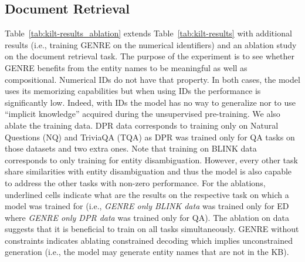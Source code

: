 \documentclass{article} \usepackage{main,times}
\makeatletter
\def\genre{\textsc{GENRE}\@\xspace}
\makeatother
\begin{document}
\subsection{Document Retrieval} \label{app:additional_retrival}
Table~\ref{tab:kilt-results_ablation} extends Table~\ref{tab:kilt-results} with additional results (i.e., training \genre on the numerical identifiers) and an ablation study on the document retrieval task. The purpose of the experiment is to see whether \genre benefits from the entity names to be meaningful as well as compositional. Numerical IDs do not have that property. In both cases, the model uses its memorizing capabilities but when using IDs the performance is significantly low. Indeed, with IDs the model has no way to generalize nor to use ``implicit knowledge'' acquired during the unsupervised pre-training. We also ablate the training data. DPR data corresponds to training only on Natural Questions (NQ) and TriviaQA (TQA) as DPR was trained only for QA tasks on those datasets and two extra ones. Note that training on BLINK data corresponds to only training for entity disambiguation. However, every other task share similarities with entity disambiguation and thus the model is also capable to address the other tasks with non-zero performance. For the ablations, underlined cells indicate what are the results on the respective task on which a model was trained for (i.e., \textit{\genre only BLINK data} was trained only for ED where\textit{ \genre only DPR data} was trained only for QA). The ablation on data suggests that it is beneficial to train on all tasks simultaneously. \genre without constraints indicates ablating constrained decoding which implies unconstrained generation (i.e., the model may generate entity names that are not in the KB).
\end{document}
